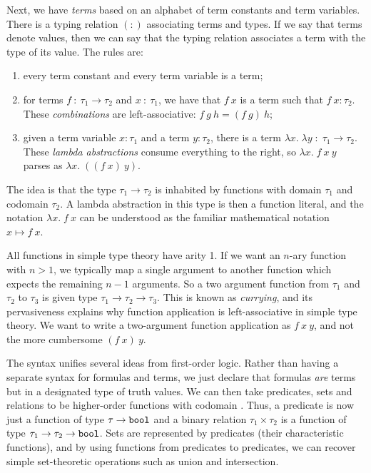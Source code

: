 Next, we have \emph{terms} based on an alphabet of term constants and term variables. There is a typing relation $(:)$ associating terms and types. If we say that terms denote values, then we can say that the typing relation associates a term with the type of its value. The rules are:
\begin{enumerate}
\item every term constant and every term variable is a term;
\item for terms $f\ :\ \tau_1\rightarrow\tau_2$ and $x\ :\ \tau_1$, we have that $f\ x$ is a term such that \mbox{$f\ x : \tau_2$}. These \emph{combinations} are left-associative: $f\ g\ h = (f\ g)\ h$;
\item given a term variable $x : \tau_1$ and a term $y : \tau_2$, there is a term $\lambda x.\;\lambda y\;:\;\tau_1 \rightarrow \tau_2$. These \emph{lambda abstractions} consume everything to the right, so $\lambda x.\; f\ x\ y$ parses as $\lambda x.\; ((f\ x)\ y)$.
\end{enumerate}

The idea is that the type $\tau_1 \rightarrow \tau_2$ is inhabited by functions with domain $\tau_1$ and codomain $\tau_2$. A lambda abstraction in this type is then a function literal, and the notation $\lambda x.\; f\ x$ can be understood as the familiar mathematical notation $x \mapsto f\ x$.

All functions in simple type theory have arity 1. If we want an $n$-ary function with \mbox{$n>1$}, we typically map a single argument to another function which expects the remaining $n-1$ arguments. So a two argument function from $\tau_1$ and $\tau_2$ to $\tau_3$ is given type $\tau_1 \rightarrow \tau_2 \rightarrow \tau_3$. This is known as \emph{currying}, and its pervasiveness explains why function application is left-associative in simple type theory. We want to write a two-argument function application as $f\ x\ y$, and not the more cumbersome $(f\ x)\ y$.

The syntax unifies several ideas from first-order logic. Rather than having a separate syntax for formulas and terms, we just declare that formulas \emph{are} terms but in a designated type  of truth values. We can then take predicates, sets and relations to be higher-order functions with codomain . Thus, a predicate is now just a function of type $\tau \rightarrow \texttt{bool}$ and a binary relation $\tau_1 \times \tau_2$ is a function of type $\tau_1 \rightarrow \tau_2 \rightarrow \texttt{bool}$. Sets are represented by predicates (their characteristic functions), and by using functions from predicates to predicates, we can recover simple set-theoretic operations such as union and intersection.

